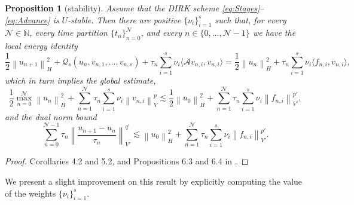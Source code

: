 \documentclass{amsart}
\newcommand{\nrm}[1]{\left\| #1 \right\|}
\newcommand{\Natural}{\mathbb{N}}
\newcommand{\mclA}{\mathcal{A}}
\newcommand{\mclQ}{\mathcal{Q}}
\newcommand{\mclN}{\mathcal{N}}
\newtheorem{proposition}{Proposition}[section]
\theoremstyle{definition}
\newcommand{\AJS}[1]{#1}
\begin{document}
\begin{proposition}[stability]
\label{prop:BochnerStable}
  Assume that \AJS{the} DIRK scheme \eqref{eq:Stages}--\eqref{eq:Advance} is $U$-stable. Then there are positive $\{\nu_i\}_{i=1}^s$ such that, for every \AJS{$\mclN \in \Natural$, every time partition $\{t_n\}_{n=0}^\mclN$, and every $n \in \{0, \ldots, \mclN-1\}$ we have the local energy identity
  \begin{equation}
    \label{eq:BochnerStableLocal}
    \frac12 \nrm{u_{n+1}}_H^2 + \mclQ_s(u_n,v_{n,1},\ldots, v_{n,s}) + \tau_n \sum_{i=1}^s \nu_i \langle \mclA v_{n,i} , v_{n,i} \rangle =
    \frac12 \nrm{u_n}_H^2 + \tau_n \sum_{i=1}^s \nu_i \langle f_{n,i}, v_{n,i} \rangle ,
  \end{equation}
  which in turn implies the global estimate,
  \begin{equation}
  \label{eq:BochnerStableGlobal}
    \frac12\max_{n=0}^{\mclN} \nrm{u_{n}}_H^2 + \sum_{n=1}^{\mclN} \tau_n \sum_{i=1}^s \nu_i \nrm{ v_{n,i} }_V^p \lesssim 
    \frac12 \nrm{u_0}_H^2 + \sum_{n=1}^{\mclN} \tau_n \sum_{i=1}^s \nu_i \nrm{ f_{n,i} }_{V'}^{p'},
  \end{equation}
  and the dual norm bound}
  \begin{equation}
  \label{eq:DualNormBound}
    \sum_{n=0}^{\mclN-1} \tau_n \nrm{ \frac{u_{n+1} - u_n}{\tau_n} }_{V'}^{q'} \lesssim \nrm{u_0}_H^2 + \sum_{n=1}^{\mclN} \tau_n \sum_{i=1}^s \nu_i \nrm{f_{n,i}}_{V'}^{p'}.
  \end{equation}
\end{proposition}
\begin{proof}
  Corollaries 4.2 and 5.2, and Propositions 6.3 and 6.4 in \cite{MR4673496}.
\end{proof}

We present a slight improvement on this result by explicitly computing the value of the weights $\{\nu_i\}_{i=1}^s$.
\end{document}
